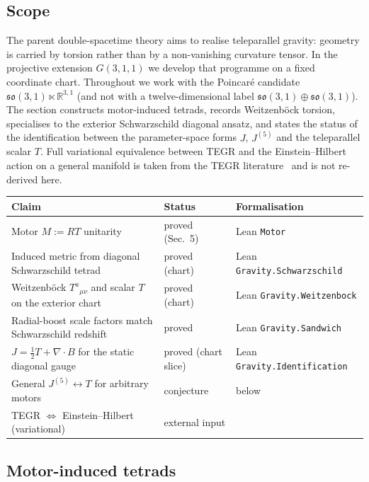 \documentclass[dvipdfmx,a4paper]{article}
\theoremstyle{definition}
\theoremstyle{plain}
\theoremstyle{remark}
\begin{document}
\subsection{Scope}

The parent double-spacetime theory aims to realise teleparallel gravity: geometry is carried by torsion rather than by a non-vanishing curvature tensor. In the projective extension \(G(3,1,1)\) we develop that programme on a fixed coordinate chart. Throughout we work with the Poincar\'{e} candidate
\(\mathfrak{so}(3,1)\ltimes\mathbb{R}^{3,1}\) (and not with a twelve-dimensional label \(\mathfrak{so}(3,1)\oplus\mathfrak{so}(3,1)\)). The section constructs motor-induced tetrads, records Weitzenb\"{o}ck torsion, specialises to the exterior Schwarzschild diagonal ansatz, and states the status of the identification between the parameter-space forms \(J\), \(J^{(5)}\) and the teleparallel scalar \(T\). Full variational equivalence between TEGR and the Einstein--Hilbert action on a general manifold is taken from the TEGR literature~\cite{maluf2013} and is not re-derived here.

\begin{center}
\footnotesize
\setlength{\tabcolsep}{4pt}
\begin{tabular}{@{}p{}p{}l@{}}
\hline
Claim & Status & Formalisation \\
\hline
Motor \(M:=RT\) unitarity & proved (Sec.~5) & Lean \texttt{Motor} \\
Induced metric from diagonal Schwarzschild tetrad & proved (chart) & Lean \texttt{Gravity.Schwarzschild} \\
Weitzenb\"{o}ck \(T^{a}{}_{\mu\nu}\) and scalar \(T\) on the exterior chart & proved (chart) & Lean \texttt{Gravity.Weitzenbock} \\
Radial-boost scale factors match Schwarzschild redshift & proved & Lean \texttt{Gravity.Sandwich} \\
\(J=\tfrac12 T+\nabla\cdot B\) for the static diagonal gauge & proved (chart slice) & Lean \texttt{Gravity.Identification} \\
General \(J^{(5)}\leftrightarrow T\) for arbitrary motors & conjecture & below \\
TEGR \(\Leftrightarrow\) Einstein--Hilbert (variational) & external input & \cite{maluf2013} \\
\hline
\end{tabular}
\end{center}

\subsection{Motor-induced tetrads}
\end{document}
